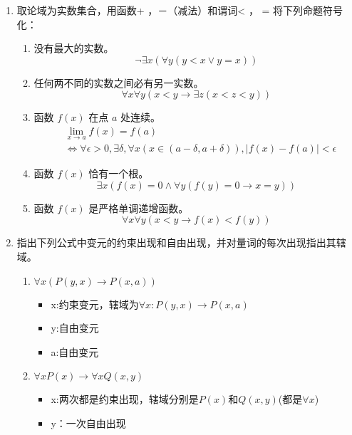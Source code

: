 \documentclass[UTF8]{ctexart}
\begin{document}
\begin{enumerate}
       \item 取论域为实数集合，用函数+ ，－（减法）和谓词< ， = 将下列命题符号化：
       \begin{enumerate}
           \item 没有最大的实数。
           \[
               \neg \exists x(\forall y(y<x \vee y=x))
           \]

           \item 任何两不同的实数之间必有另一实数。
           \[
               \forall x \forall y(x<y \rightarrow \exists z(x<z<y))
           \]
            
           
           \item 函数 $f (x)$ 在点 $a$ 处连续。
           \[
                \begin{aligned}
                    &\lim_{x\rightarrow a}f(x)=f(a)\\
                    &\Leftrightarrow \forall \epsilon >0,\exists \delta,\forall x(x\in(a-\delta,a+\delta)),|f(x)-f(a)|<\epsilon
                \end{aligned}    
           \]
            
           
           \item 函数 $f (x)$ 恰有一个根。
           \[
               \exists x(f(x)=0\wedge \forall y(f(y)=0\rightarrow x=y))
           \]
            
           
           \item 函数 $f (x)$ 是严格单调递增函数。
           \[
               \forall x\forall y(x<y\rightarrow f(x)<f(y))
           \]
           
       \end{enumerate}
       \item 指出下列公式中变元的约束出现和自由出现，并对量词的每次出现指出其辖域。
       \begin{enumerate}
           \item $\forall x(P(y, x) \rightarrow  P(x, a))$
           \begin{itemize}
               \item x:约束变元，辖域为$\forall x:P(y, x) \rightarrow  P(x, a)$
               \item y:自由变元
               \item a:自由变元
           \end{itemize}

           \item $\forall xP(x) \rightarrow  \forall xQ(x, y)$
           \begin{itemize}
               \item x:两次都是约束出现，辖域分别是$P(x)$和$Q(x,y)$(都是$\forall x$)
               \item y：一次自由出现
           \end{itemize}
           

\end{enumerate}
\end{enumerate}
\end{document}
